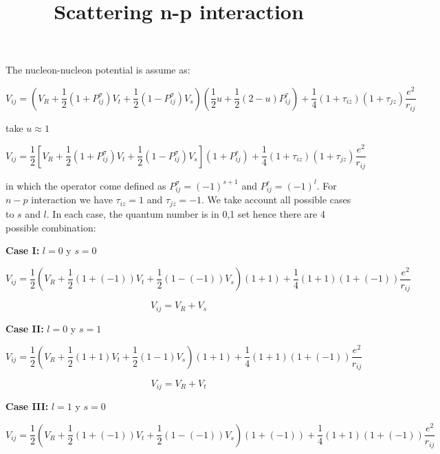 \documentclass{article}
\title{Scattering n-p interaction}
\begin{document}
\maketitle

The nucleon-nucleon potential is assume as:

\begin{equation}
    V_{ij} = (V_{R} + \frac{1}{2}(1 + P_{ij}^{\sigma})V_{t} + \frac{1}{2}(1 - P_{ij}^{\sigma})V_{s})(\frac{1}{2}u + \frac{1}{2}(2 - u)P_{ij}^{\tau}) + \frac{1}{4}(1 + \tau_{iz})(1 + \tau_{jz})\frac{e^{2}}{r_{ij}}
\end{equation}

take $u\approx 1$

\begin{equation}
    V_{ij} = \frac{1}{2}\left[V_{R} + \frac{1}{2}(1 + P_{ij}^{\sigma})V_{t} + \frac{1}{2}(1 - P_{ij}^{\sigma})V_{s}\right](1 + P_{ij}^{r}) + \frac{1}{4}(1 + \tau_{iz})(1 + \tau_{jz})\frac{e^{2}}{r_{ij}}
\end{equation}

in which the operator come defined as $P_{ij}^{\sigma} = (-1)^{s+1}$ and $P_{ij}^{r} = (-1)^{l}$. For $n-p$ interaction we have $\tau_{iz} = 1$ and $\tau_{jz} = -1$. We take account all possible cases to $s$ and $l$. In each case, the quantum number is in {0,1} set hence there are 4 possible combination:

\textbf{Case I:} $l=0$ y $s=0$

\begin{equation}
    V_{ij} = \frac{1}{2}(V_{R} + \frac{1}{2}(1 + (-1))V_{t} + \frac{1}{2}(1 - (-1))V_{s})(1 + 1) + \frac{1}{4}(1 + 1)(1 + (-1))\frac{e^{2}}{r_{ij}}
\end{equation}

\begin{equation}
    V_{ij} = V_R + V_s
\end{equation}

\textbf{Case II:} $l=0$ y $s=1$

\begin{equation}
    V_{ij} = \frac{1}{2}(V_{R} + \frac{1}{2}(1 + 1)V_{t} + \frac{1}{2}(1 - 1)V_{s})(1 + 1) + \frac{1}{4}(1 + 1)(1 + (-1))\frac{e^{2}}{r_{ij}}
\end{equation}

\begin{equation}
    V_{ij} = V_R + V_t
\end{equation}

\textbf{Case III:} $l=1$ y $s=0$

\begin{equation}
    V_{ij} = \frac{1}{2}(V_{R} + \frac{1}{2}(1 + (-1))V_{t} + \frac{1}{2}(1 - (-1))V_{s})(1 + (-1)) + \frac{1}{4}(1 + 1)(1 + (-1))\frac{e^{2}}{r_{ij}}
\end{equation}
\end{document}
